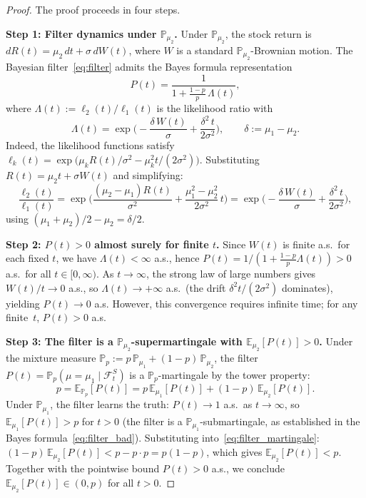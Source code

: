 \documentclass[12pt]{article}
\theoremstyle{remark}
\theoremstyle{definition}
\newcommand{\E}{\mathbb{E}}
\newcommand{\Prob}{\mathbb{P}}
\begin{document}
\begin{proof}
The proof proceeds in four steps.

\medskip\noindent\textbf{Step 1: Filter dynamics under $\Prob_{\mu_2}$.}
Under $\Prob_{\mu_2}$, the stock return is $dR(t) = \mu_2\,dt + \sigma\,dW(t)$,
where $W$ is a standard $\Prob_{\mu_2}$-Brownian motion.
The Bayesian filter~\eqref{eq:filter} admits the Bayes formula
representation
\begin{equation}\label{eq:filter_bad}
  P(t) = \frac{1}{1 + \frac{1-p}{p}\,\Lambda(t)},
\end{equation}
where $\Lambda(t) := \ell_2(t)/\ell_1(t)$ is the likelihood ratio with
\begin{equation}\label{eq:Lambda_bad}
  \Lambda(t) = \exp\!\biggl(-\frac{\delta\,W(t)}{\sigma}
  + \frac{\delta^2\,t}{2\sigma^2}\biggr), \qquad \delta := \mu_1 - \mu_2.
\end{equation}
Indeed, the likelihood functions satisfy
$\ell_k(t) = \exp\bigl(\mu_k R(t)/\sigma^2 - \mu_k^2 t/(2\sigma^2)\bigr)$.
Substituting $R(t) = \mu_2 t + \sigma W(t)$ and simplifying:
\[
  \frac{\ell_2(t)}{\ell_1(t)}
  = \exp\!\biggl(\frac{(\mu_2 - \mu_1)R(t)}{\sigma^2}
  + \frac{\mu_1^2 - \mu_2^2}{2\sigma^2}\,t\biggr)
  = \exp\!\biggl(-\frac{\delta\,W(t)}{\sigma}
  + \frac{\delta^2\,t}{2\sigma^2}\biggr),
\]
using $(\mu_1+\mu_2)/2 - \mu_2 = \delta/2$.

\medskip\noindent\textbf{Step 2: $P(t) > 0$ almost surely for finite $t$.}
Since $W(t)$ is finite a.s.\ for each fixed $t$, we have $\Lambda(t) < \infty$
a.s., hence $P(t) = 1/(1 + \frac{1-p}{p}\Lambda(t)) > 0$ a.s.\ for all
$t \in [0,\infty)$.
As $t \to \infty$, the strong law of large numbers gives $W(t)/t \to 0$ a.s.,
so $\Lambda(t) \to +\infty$ a.s.\ (the drift $\delta^2 t/(2\sigma^2)$
dominates), yielding $P(t) \to 0$ a.s.
However, this convergence requires infinite time; for any finite~$t$,
$P(t) > 0$ a.s.

\medskip\noindent\textbf{Step 3: The filter is a $\Prob_{\mu_2}$-supermartingale
with $\E_{\mu_2}[P(t)] > 0$.}
Under the mixture measure $\Prob_p := p\,\Prob_{\mu_1} + (1-p)\,\Prob_{\mu_2}$,
the filter $P(t) = \Prob_p(\mu = \mu_1 \mid \mathcal{F}_t^S)$ is a
$\Prob_p$-martingale by the tower property:
\begin{equation}\label{eq:filter_martingale}
  p = \E_{\Prob_p}[P(t)]
  = p\,\E_{\mu_1}[P(t)] + (1-p)\,\E_{\mu_2}[P(t)].
\end{equation}
Under $\Prob_{\mu_1}$, the filter learns the truth:
$P(t) \to 1$ a.s.\ as $t \to \infty$, so $\E_{\mu_1}[P(t)] > p$ for $t > 0$
(the filter is a $\Prob_{\mu_1}$-submartingale, as established in
the Bayes formula~\eqref{eq:filter_bad}).
Substituting into~\eqref{eq:filter_martingale}:
$(1-p)\,\E_{\mu_2}[P(t)] < p - p\cdot p = p(1-p)$,
which gives $\E_{\mu_2}[P(t)] < p$.
Together with the pointwise bound $P(t) > 0$ a.s., we conclude
$\E_{\mu_2}[P(t)] \in (0, p)$ for all $t > 0$.


\end{proof}
\end{document}
